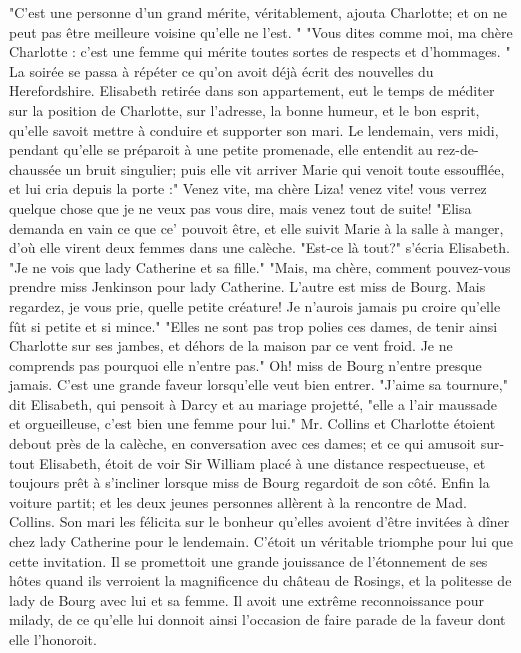 "C'est une personne d'un grand mérite, véritablement, ajouta Charlotte; et on ne peut pas être meilleure voisine qu'elle ne l'est. "
"Vous dites comme moi, ma chère Charlotte : c'est une femme qui mérite toutes sortes de respects et d'hommages. "
La soirée se passa à répéter ce qu'on avoit déjà écrit des nouvelles du Herefordshire. Elisabeth retirée dans son appartement, eut le temps de méditer sur la position de Charlotte, sur l'adresse, la bonne humeur, et le bon esprit, qu'elle savoit mettre à conduire et supporter son mari.
Le lendemain, vers midi, pendant qu'elle se préparoit à une petite promenade, elle entendit au rez-de-chaussée un bruit singulier; puis elle vit arriver Marie qui venoit toute essoufflée, et lui cria depuis la porte :" Venez vite, ma chère Liza! venez vite! vous\setcounter{page}{527} verrez quelque chose que je ne veux pas vous dire, mais venez tout de suite! "Elisa demanda en vain ce que ce' pouvoit être, et elle suivit Marie à la salle à manger, d'où elle virent deux femmes dans une calèche.
"Est-ce là tout?" s'écria Elisabeth. "Je ne vois que lady Catherine et sa fille." "Mais, ma chère, comment pouvez-vous prendre miss Jenkinson pour lady Catherine. L'autre est miss de Bourg. Mais regardez, je vous prie, quelle petite créature! Je n'aurois jamais pu croire qu'elle fût si petite et si mince."
"Elles ne sont pas trop polies ces dames, de tenir ainsi Charlotte sur ses jambes, et déhors de la maison par ce vent froid. Je ne comprends pas pourquoi elle n'entre pas."
Oh! miss de Bourg n'entre presque jamais. C'est une grande faveur lorsqu'elle veut bien entrer. "J'aime sa tournure," dit Elisabeth, qui pensoit à Darcy et au mariage projetté, "elle a l'air maussade et orgueilleuse, c'est bien une femme pour lui."
Mr. Collins et Charlotte étoient debout près de la calèche, en conversation avec ces dames; et ce qui amusoit sur-tout Elisabeth, étoit de voir Sir William placé à une\setcounter{page}{528} distance respectueuse, et toujours prêt à s'incliner lorsque miss de Bourg regardoit de son côté. Enfin la voiture partit; et les deux jeunes personnes allèrent à la rencontre de Mad. Collins. Son mari les félicita sur le bonheur qu'elles avoient d'être invitées à dîner chez lady Catherine pour le lendemain. C'étoit un véritable triomphe pour lui que cette invitation. Il se promettoit une grande jouissance de l'étonnement de ses hôtes quand ils verroient la magnificence du château de Rosings, et la politesse de lady de Bourg avec lui et sa femme. Il avoit une extrême reconnoissance pour milady, de ce qu'elle lui donnoit ainsi l'occasion de faire parade de la faveur dont elle l'honoroit.

